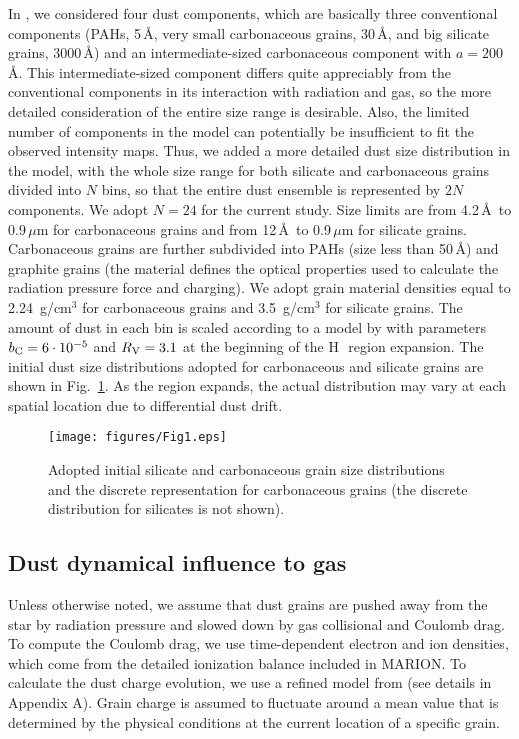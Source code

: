 \documentclass[a4paper,fleqn,usenatbib]{mnras}
\newcommand{\hii}    {H\,{\sc{ii}}~}
\begin{document}
In , we considered four dust components, which are basically three conventional components (PAHs, 5\,\AA, very small carbonaceous grains, 30\,\AA, and big silicate grains, 3000\,\AA) and an intermediate-sized carbonaceous component with $a=200$\,\AA. This intermediate-sized component differs quite appreciably from the conventional components in its interaction with radiation and gas, so the more detailed consideration of the entire size range is desirable. Also, the limited number of components in the model can potentially be insufficient to fit the observed intensity maps. Thus, we added a more detailed dust size distribution in the model, with the whole size range for both silicate and carbonaceous grains divided into $N$ bins, so that the entire dust ensemble is represented by $2N$ components. We adopt $N=24$ for the current study. Size limits are from 4.2\,\AA\ to 0.9\,$\mu$m for carbonaceous grains and from 12\,\AA\ to 0.9\,$\mu$m for silicate grains. Carbonaceous grains are further subdivided into PAHs (size less than 50\,\AA) and graphite grains (the material defines the optical properties used to calculate the radiation pressure force and charging). We adopt grain material densities equal to 2.24~g/cm$^3$ for carbonaceous grains and 3.5~g/cm$^3$ for silicate grains. The amount of dust in each bin is scaled according to a model by \cite{WD2011} with parameters $b_{\rm C}=6\cdot10^{-5}$ and $R_{\rm V}=3.1$ at the beginning of the \hii region expansion. The initial dust size distributions adopted for carbonaceous and silicate grains are shown in Fig.~\ref{fig:discretedust}. As the region expands, the actual distribution may vary at each spatial location due to differential dust drift.

\begin{figure}
\centering
\texttt{[image: figures/Fig1.eps]}
\caption{Adopted initial silicate and carbonaceous grain size distributions and the discrete representation for carbonaceous grains (the discrete distribution for silicates is not shown).}
\label{fig:discretedust}
\end{figure}

\subsection{Dust dynamical influence to gas}

Unless otherwise noted, we assume that dust grains are pushed away from the star by radiation pressure and slowed down by gas collisional and Coulomb drag. To compute the Coulomb drag, we use time-dependent electron and ion densities, which come from the detailed ionization balance included in MARION. To calculate the dust charge evolution, we use a refined model from  (see details in Appendix A). Grain charge is assumed to fluctuate around a mean value that is determined by the physical conditions at the current location of a specific grain.
\end{document}
